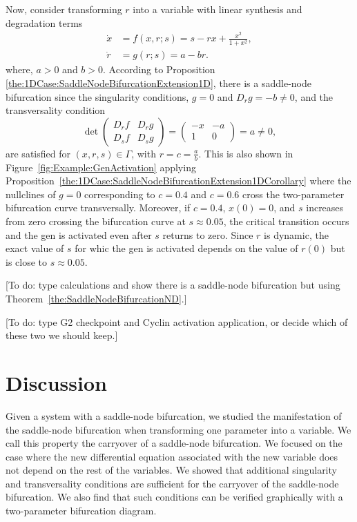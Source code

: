 \documentclass[12pt]{article}
\begin{document}
Now, consider transforming $r$ into a variable with linear synthesis and degradation terms
\begin{equation}
    \begin{aligned}
        \dot x & = f(x,r;s) = s - rx + \frac{x^{2}}{1+x^{2}}, \\
        \dot r & = g(r;s) = a - br.
    \end{aligned}
    \label{equ:Example:GenActivation:2D}
\end{equation}
where, $a>0$ and $b>0$.
According to Proposition \ref{the:1DCase:SaddleNodeBifurcationExtension1D}, there is a saddle-node bifurcation since the singularity conditions, $g=0$ and $D_{r}g=-b\neq 0$, and the transversality condition
\[\det\begin{pmatrix}
            D_{r}f & D_{r}g \\
            D_{s}f & D_{s}g
        \end{pmatrix} = 
        \begin{pmatrix}
            -x & -a\\
            1 & 0
        \end{pmatrix} = a \neq 0,\]
are satisfied for $(x,r,s)\in \Gamma$, with $r=c=\frac{a}{b}$. This is also shown in Figure~\ref{fig:Example:GenActivation} applying Proposition~\ref{the:1DCase:SaddleNodeBifurcationExtension1DCorollary} where the nullclines of $g=0$ corresponding to $c=0.4$ and $c=0.6$ cross the two-parameter bifurcation curve transversally. Moreover, if $c=0.4$, $x(0)=0$, and $s$ increases from zero crossing the bifurcation curve at $s\approx0.05$, the critical transition occurs and the gen is activated even after $s$ returns to zero. Since $r$ is dynamic, the exact value of $s$ for whic the gen is activated depends on the value of $r(0)$ but is close to $s\approx0.05$. 

[To do: type calculations and show there is a saddle-node bifurcation but using Theorem~\ref{the:SaddleNodeBifurcationND}.]

[To do: type G2 checkpoint and Cyclin activation application, or decide which of these two we should keep.]


\section{Discussion}
\label{sec:Discussion}

Given a system with a saddle-node bifurcation, we studied the manifestation of the saddle-node bifurcation when transforming one parameter into a variable. We call this property the carryover of a saddle-node bifurcation. We focused on the case where the new differential equation associated with the new variable does not depend on the rest of the variables. We showed that additional singularity and transversality conditions are sufficient for the carryover of the saddle-node bifurcation. We also find that such conditions can be verified graphically with a two-parameter bifurcation diagram.
\end{document}

